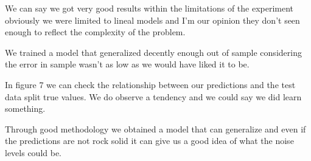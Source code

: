 \documentclass{article}
\begin{document}
We can say we got very good results within the limitations of the experiment obviously we were limited to lineal models and I'm our opinion they don't seen enough to reflect the complexity of the problem.

We trained a model that generalized decently enough out of sample considering the error in sample wasn't as low as we would have liked it to be.

In figure 7 we can check the relationship between our predictions and the test data split true values. We do observe a tendency and we could say we did learn something.

Through good methodology we obtained a model that can generalize and even if the predictions are not rock solid it can give us a good idea of what the noise levels could be.


\newpage



\end{document}
